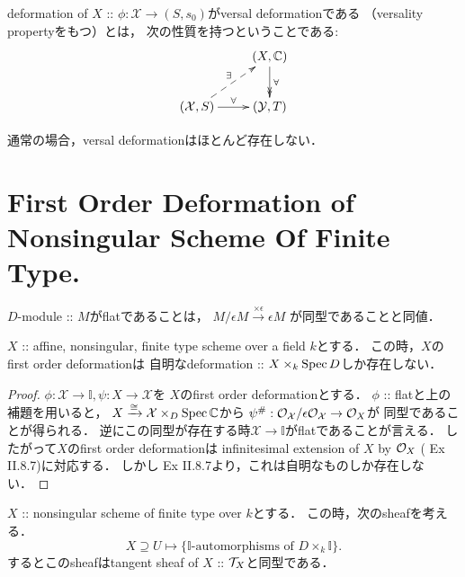 \documentclass[a4paper]{jsarticle}
\newcommand{\dualnum}{\mathbb{I}}
\newcommand{\famX}{\mathcal{X}}
\newcommand{\famY}{\mathcal{Y}}
\begin{document}
    \begin{Def}
        deformation of $X$ :: $\phi: \famX \to (S, s_0)$がversal deformationである
        （versality propertyをもつ）とは，
        次の性質を持つということである:
        \[\xymatrix{
            {} & (X, \C) \ar@{->>}[d]^-{\forall} \\
            (\famX, S) \ar@{-->}[ru]^-{\exists} \ar[r]^-{\forall}& (\famY, T)
        }\]
    \end{Def}

    通常の場合，versal deformationはほとんど存在しない．


\section{First Order Deformation of Nonsingular Scheme Of Finite Type.}
    \begin{Lemma}
        $D$-module :: $M$がflatであることは，
        $M/\epsilon M \xrightarrow{\times \epsilon} \epsilon M$
        が同型であることと同値．
    \end{Lemma}

    \begin{Lemma}
        $X$ :: affine, nonsingular, finite type scheme over a field $k$とする．
        この時，$X$のfirst order deformationは
        自明なdeformation :: $X \times_k \operatorname{Spec} D$しか存在しない．
    \end{Lemma}
    \begin{proof}
        $\phi: \famX \to \dualnum, \psi: X \to \famX$を
        $X$のfirst order deformationとする．
        $\phi$ :: flatと上の補題を用いると，
        $X \isomap \famX \times_{D} \Spec \C$から
        $\psi^{\#}: \shO_{\famX}/\epsilon \shO_{\famX} \to \shO_X$が
        同型であることが得られる．
        逆にこの同型が存在する時$\famX \to \dualnum$がflatであることが言える．
        したがって$X$のfirst order deformationは
        infinitesimal extension of $X$ by $\mathcal{O}_X$ (\cite{HarAG} Ex II.8.7)に対応する．
        しかし\cite{HarAG} Ex II.8.7より，これは自明なものしか存在しない．
    \end{proof}

    \begin{Lemma}
        $X$ :: nonsingular scheme of finite type over $k$とする．
        この時，次のsheafを考える．
        \[ X \supseteq U \mapsto \{ \text{$\dualnum$-automorphisms of $D \times_k \dualnum$} \}. \]
        するとこのsheafはtangent sheaf of $X$ :: $\mathcal{T}_X$と同型である．
    \end{Lemma}
\end{document}
